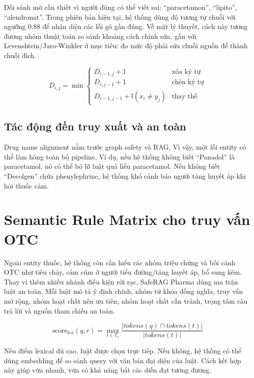 Đối sánh mờ cần thiết vì người dùng có thể viết sai: ``paracetamon'', ``lipito'', ``alendronat''. Trong phiên bản hiện tại, hệ thống dùng độ tương tự chuỗi với ngưỡng 0.88 để nhận diện các lỗi gõ gần đúng. Về mặt lý thuyết, cách này tương đương nhóm thuật toán so sánh khoảng cách chỉnh sửa, gần với Levenshtein/Jaro-Winkler ở mục tiêu: đo mức độ phải sửa chuỗi nguồn để thành chuỗi đích.

\begin{formulabox}
\[
D_{i,j}=
\min
\begin{cases}
D_{i-1,j}+1 & \text{xóa ký tự}\\
D_{i,j-1}+1 & \text{chèn ký tự}\\
D_{i-1,j-1}+\mathbb{I}(x_i\ne y_j) & \text{thay thế}
\end{cases}
\]
\end{formulabox}

\subsection{Tác động đến truy xuất và an toàn}

Drug name alignment nằm trước graph safety và RAG. Vì vậy, một lỗi entity có thể làm hỏng toàn bộ pipeline. Ví dụ, nếu hệ thống không biết ``Panadol'' là paracetamol, nó có thể bỏ lỡ luật quá liều paracetamol. Nếu không biết ``Decolgen'' chứa phenylephrine, hệ thống khó cảnh báo người tăng huyết áp khi hỏi thuốc cảm.

\section{Semantic Rule Matrix cho truy vấn OTC}

Ngoài entity thuốc, hệ thống còn cần hiểu các nhóm triệu chứng và bối cảnh OTC như tiêu chảy, cảm cúm ở người tiểu đường/tăng huyết áp, bổ sung kẽm. Thay vì thêm nhiều nhánh điều kiện rời rạc, SafeRAG Pharma dùng ma trận luật an toàn. Mỗi luật mô tả ý định chính, nhóm từ khóa đồng nghĩa, truy vấn mở rộng, nhóm hoạt chất nên ưu tiên, nhóm hoạt chất cần tránh, trọng tâm câu trả lời và nguồn tham chiếu an toàn.

\begin{formulabox}
\[
\mathrm{score}_{lex}(q,r)=
\max_{t\in T_r}
\frac{|tokens(q)\cap tokens(t)|}{|tokens(t)|}
\]
\end{formulabox}

Nếu điểm lexical đủ cao, luật được chọn trực tiếp. Nếu không, hệ thống có thể dùng embedding để so sánh query với văn bản đại diện của luật. Cách kết hợp này giúp vừa nhanh, vừa có khả năng bắt các diễn đạt tương đương.

